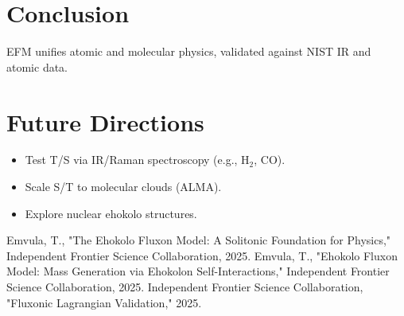 \documentclass{article}
\begin{document}
\section{Conclusion}
EFM unifies atomic and molecular physics, validated against NIST IR and atomic data.

\section{Future Directions}
\begin{itemize}
    \item Test T/S via IR/Raman spectroscopy (e.g., H$_2$, CO).
    \item Scale S/T to molecular clouds (ALMA).
    \item Explore nuclear ehokolo structures.
\end{itemize}

\begin{thebibliography}{3}
 Emvula, T., "The Ehokolo Fluxon Model: A Solitonic Foundation for Physics," Independent Frontier Science Collaboration, 2025.
 Emvula, T., "Ehokolo Fluxon Model: Mass Generation via Ehokolon Self-Interactions," Independent Frontier Science Collaboration, 2025.
 Independent Frontier Science Collaboration, "Fluxonic Lagrangian Validation," 2025.
\end{thebibliography}
\end{document}
